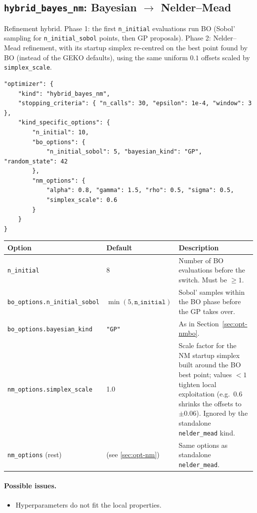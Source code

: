 \subsection{\texttt{hybrid\_bayes\_nm}: Bayesian $\to$ Nelder--Mead}
\label{sec:opt-bonm}

Refinement hybrid.  Phase 1: the first \texttt{n\_initial} evaluations run
BO (Sobol' sampling for \texttt{n\_initial\_sobol} points, then GP
proposals).  Phase 2: Nelder--Mead refinement, with its startup simplex
re-centred on the best point found by BO (instead of the GEKO defaults),
using the same uniform $0.1$ offsets scaled by \texttt{simplex\_scale}.

\begin{lstlisting}
"optimizer": {
    "kind": "hybrid_bayes_nm",
    "stopping_criteria": { "n_calls": 30, "epsilon": 1e-4, "window": 3 },
    "kind_specific_options": {
        "n_initial": 10,
        "bo_options": {
            "n_initial_sobol": 5, "bayesian_kind": "GP", "random_state": 42
        },
        "nm_options": {
            "alpha": 0.8, "gamma": 1.5, "rho": 0.5, "sigma": 0.5,
            "simplex_scale": 0.6
        }
    }
}
\end{lstlisting}

\begin{center}
\begin{tabular}{@{}llp{7.6cm}@{}}
\toprule
Option & Default & Description \\
\midrule
\texttt{n\_initial} & 8 & Number of BO evaluations before the switch.
Must be $\geq 1$. \\
\texttt{bo\_options.n\_initial\_sobol} & $\min(5, \texttt{n\_initial})$ &
Sobol' samples within the BO phase before the GP takes over. \\
\texttt{bo\_options.bayesian\_kind} & \texttt{"GP"} & As in
Section~\ref{sec:opt-nmbo}. \\
\texttt{nm\_options.simplex\_scale} & 1.0 & Scale factor for the NM startup
simplex built around the BO best point; values $<1$ tighten local
exploitation (e.g.\ $0.6$ shrinks the offsets to $\pm 0.06$).  Ignored by
the standalone \texttt{nelder\_mead} kind. \\
\texttt{nm\_options} (rest) & (see \ref{sec:opt-nm}) & Same options as
standalone \texttt{nelder\_mead}. \\
\bottomrule
\end{tabular}
\end{center}

\paragraph{Possible issues.}
\begin{itemize}
  \item Hyperparameters do not fit the local properties.
\end{itemize}

